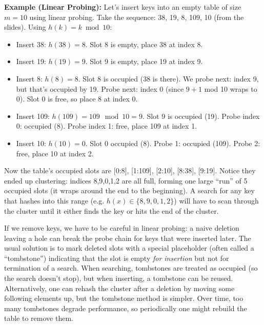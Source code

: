 \documentclass[11pt]{article}
\begin{document}
\textbf{Example (Linear Probing):} Let’s insert keys into an empty table of size $m=10$ using linear probing. Take the sequence: 38, 19, 8, 109, 10 (from the slides). Using $h(k)=k \bmod 10$:
\begin{itemize}
  \item Insert 38: $h(38)=8$. Slot 8 is empty, place 38 at index 8.
  \item Insert 19: $h(19)=9$. Slot 9 is empty, place 19 at index 9.
  \item Insert 8: $h(8)=8$. Slot 8 is occupied (38 is there). We probe next: index 9, but that’s occupied by 19. Probe next: index 0 (since $9+1$ mod 10 wraps to 0). Slot 0 is free, so place 8 at index 0.
  \item Insert 109: $h(109)=109 \mod 10 = 9$. Slot 9 is occupied (19). Probe index 0: occupied (8). Probe index 1: free, place 109 at index 1.
  \item Insert 10: $h(10)=0$. Slot 0 occupied (8). Probe 1: occupied (109). Probe 2: free, place 10 at index 2.
\end{itemize}
Now the table’s occupied slots are [0:8], [1:109], [2:10], [8:38], [9:19]. Notice they ended up clustering: indices 8,9,0,1,2 are all full, forming one large “run” of 5 occupied slots (it wraps around the end to the beginning). A search for any key that hashes into this range (e.g. $h(x) \in \{8,9,0,1,2\}$) will have to scan through the cluster until it either finds the key or hits the end of the cluster.

If we remove keys, we have to be careful in linear probing: a naive deletion leaving a hole can break the probe chain for keys that were inserted later. The usual solution is to mark deleted slots with a special placeholder (often called a “tombstone”) indicating that the slot is empty \emph{for insertion} but not for termination of a search. When searching, tombstones are treated as occupied (so the search doesn’t stop), but when inserting, a tombstone can be reused. Alternatively, one can rehash the cluster after a deletion by moving some following elements up, but the tombstone method is simpler. Over time, too many tombstones degrade performance, so periodically one might rebuild the table to remove them.
\end{document}
